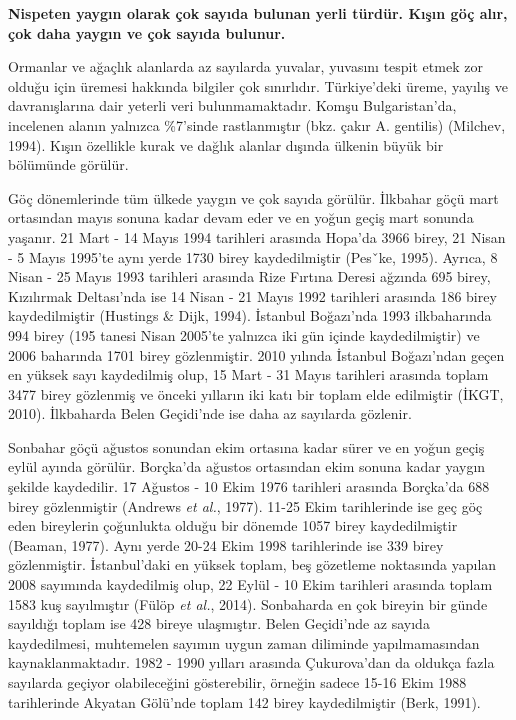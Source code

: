 \documentclass[
  a4paper,
  DIV=11,
  numbers=noendperiod]{scrreprt}
\begin{document}
\textbf{Nispeten yaygın olarak çok sayıda bulunan yerli türdür. Kışın
göç alır, çok daha yaygın ve çok sayıda bulunur.}

Ormanlar ve ağaçlık alanlarda az sayılarda yuvalar, yuvasını tespit
etmek zor olduğu için üremesi hakkında bilgiler çok sınırlıdır.
Türkiye'deki üreme, yayılış ve davranışlarına dair yeterli veri
bulunmamaktadır. Komşu Bulgaristan'da, incelenen alanın yalnızca
\%7'sinde rastlanmıştır (bkz. çakır A. gentilis) (Milchev, 1994). Kışın
özellikle kurak ve dağlık alanlar dışında ülkenin büyük bir bölümünde
görülür.

Göç dönemlerinde tüm ülkede yaygın ve çok sayıda görülür. İlkbahar göçü
mart ortasından mayıs sonuna kadar devam eder ve en yoğun geçiş mart
sonunda yaşanır. 21 Mart - 14 Mayıs 1994 tarihleri arasında Hopa'da 3966
birey, 21 Nisan - 5 Mayıs 1995'te aynı yerde 1730 birey kaydedilmiştir
(Pesˇke, 1995). Ayrıca, 8 Nisan - 25 Mayıs 1993 tarihleri arasında Rize
Fırtına Deresi ağzında 695 birey, Kızılırmak Deltası'nda ise 14 Nisan -
21 Mayıs 1992 tarihleri arasında 186 birey kaydedilmiştir (Hustings \&
Dijk, 1994). İstanbul Boğazı'nda 1993 ilkbaharında 994 birey (195 tanesi
Nisan 2005'te yalnızca iki gün içinde kaydedilmiştir) ve 2006 baharında
1701 birey gözlenmiştir. 2010 yılında İstanbul Boğazı'ndan geçen en
yüksek sayı kaydedilmiş olup, 15 Mart - 31 Mayıs tarihleri arasında
toplam 3477 birey gözlenmiş ve önceki yılların iki katı bir toplam elde
edilmiştir (İKGT, 2010). İlkbaharda Belen Geçidi'nde ise daha az
sayılarda gözlenir.

Sonbahar göçü ağustos sonundan ekim ortasına kadar sürer ve en yoğun
geçiş eylül ayında görülür. Borçka'da ağustos ortasından ekim sonuna
kadar yaygın şekilde kaydedilir. 17 Ağustos - 10 Ekim 1976 tarihleri
arasında Borçka'da 688 birey gözlenmiştir (Andrews \emph{et al.}, 1977).
11-25 Ekim tarihlerinde ise geç göç eden bireylerin çoğunlukta olduğu
bir dönemde 1057 birey kaydedilmiştir (Beaman, 1977). Aynı yerde 20-24
Ekim 1998 tarihlerinde ise 339 birey gözlenmiştir. İstanbul'daki en
yüksek toplam, beş gözetleme noktasında yapılan 2008 sayımında
kaydedilmiş olup, 22 Eylül - 10 Ekim tarihleri arasında toplam 1583 kuş
sayılmıştır (Fülöp \emph{et al.}, 2014). Sonbaharda en çok bireyin bir
günde sayıldığı toplam ise 428 bireye ulaşmıştır. Belen Geçidi'nde az
sayıda kaydedilmesi, muhtemelen sayımın uygun zaman diliminde
yapılmamasından kaynaklanmaktadır. 1982 - 1990 yılları arasında
Çukurova'dan da oldukça fazla sayılarda geçiyor olabileceğini
gösterebilir, örneğin sadece 15-16 Ekim 1988 tarihlerinde Akyatan
Gölü'nde toplam 142 birey kaydedilmiştir (Berk, 1991).
\end{document}
